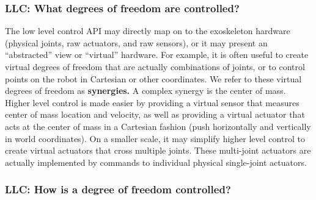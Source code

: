 \documentclass[letterpaper,12pt,fullpage]{article}
\begin{document}
\subsubsection{LLC: What degrees of freedom are controlled?}

The low level control API may directly map on to the exoskeleton hardware
(physical joints,
raw actuators, and raw sensors), or
it may present an ``abstracted'' view or ``virtual'' hardware.
For example, it is often useful to create virtual degrees of freedom that are
actually combinations of joints, or to control points on the robot in Cartesian
or other coordinates. We refer to these virtual degrees of freedom as {\bf synergies.}
A complex synergy is the center of mass. Higher level control is made easier by
providing a virtual sensor that measures center of mass location and velocity,
as well as providing a virtual actuator that acts at the center of mass in
a Cartesian fashion (push horizontally and vertically in world coordinates).
On a smaller scale, it may simplify higher level control 
to create virtual actuators that cross
multiple joints. These multi-joint actuators are actually implemented by commands
to individual physical single-joint actuators.

\subsubsection{LLC: How is a degree of freedom controlled?}
\end{document}
